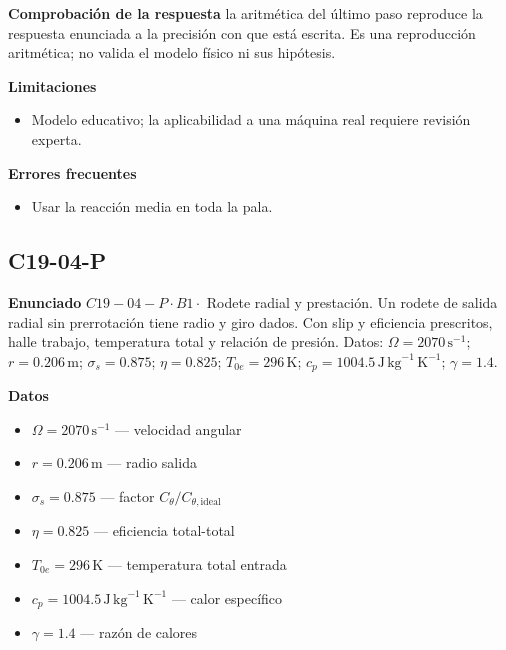 \documentclass[10pt,openany]{book}
\begin{document}
\noindent\textbf{Comprobación de la respuesta} la aritmética del último paso reproduce la respuesta enunciada a la precisión con que está escrita. Es una reproducción aritmética; no valida el modelo físico ni sus hipótesis.

\noindent\textbf{Limitaciones}
\begin{itemize}
\item Modelo educativo; la aplicabilidad a una máquina real requiere revisión experta.
\end{itemize}

\noindent\textbf{Errores frecuentes}
\begin{itemize}
\item Usar la reacción media en toda la pala.
\end{itemize}
\begin{center}\end{center}
\subsection*{C19-04-P}

\noindent\textbf{Enunciado}
\(C19-04-P \cdot B1 \cdot\) Rodete radial y prestación. Un rodete de salida radial sin prerrotación tiene radio y giro dados. Con slip y eficiencia prescritos, halle trabajo, temperatura total y relación de presión. Datos: \(\Omega=2070\, \mathrm{s}^{-1}\); \(r=0.206\, \mathrm{m}\); \(\sigma_s=0.875\); \(\eta=0.825\); \(T_{0e}=296\, \mathrm{K}\); \(c_p=1004.5\, \mathrm{J}\,\mathrm{kg}^{-1}\,\mathrm{K}^{-1}\); \(\gamma=1.4\).

\noindent\textbf{Datos}
\begin{itemize}
\item $\Omega = 2070\,\mathrm{s}^{-1}$ — velocidad angular
\item $r = 0.206\,\mathrm{m}$ — radio salida
\item $\sigma_s = 0.875$ — factor $C_\theta/C_{\theta,\mathrm{ideal}}$
\item $\eta = 0.825$ — eficiencia total-total
\item $T_{0e} = 296\,\mathrm{K}$ — temperatura total entrada
\item $c_p = 1004.5\,\mathrm{J}\,\mathrm{kg}^{-1}\,\mathrm{K}^{-1}$ — calor específico
\item $\gamma = 1.4$ — razón de calores
\end{itemize}
\end{document}
